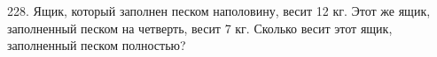 228. Ящик, который заполнен песком наполовину, весит 12 кг. Этот же ящик, заполненный песком на четверть, весит 7 кг. Сколько весит этот ящик, заполненный песком полностью?\\

